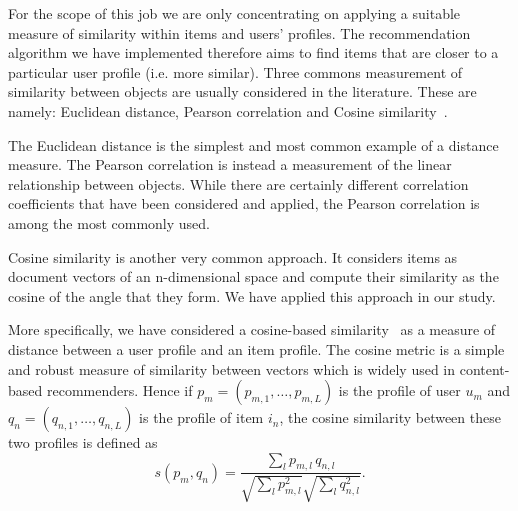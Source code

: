 For the scope of this job we are only concentrating on applying a suitable measure of similarity within items and users' profiles. The recommendation algorithm we have implemented therefore aims to find items that are closer to a particular user profile (i.e. more similar). Three commons measurement of similarity between objects are usually considered in the literature. These are namely: Euclidean distance, Pearson correlation and Cosine similarity~\cite{Lops11B}. 

The Euclidean distance is the simplest and most common example of a distance measure. The Pearson correlation is instead a measurement of the linear relationship between objects. While there are certainly different correlation coefficients that have been considered and applied, the Pearson correlation is among the most commonly used. 

Cosine similarity is another very common approach. It considers items as document vectors of an n-dimensional space and compute their similarity as the cosine of the angle that they form. We have applied this approach in our study.

More specifically, we have considered a cosine-based similarity~\cite{Markines09WWW} as a measure of distance between a user profile and an item profile.
The cosine metric is a simple and robust measure of similarity between vectors which is widely used in content-based recommenders.
Hence if $p_m = (p_{m,1},\ldots,p_{m,L})$ is the profile of user $u_m$ and $ q_n=(q_{n,1},\ldots,q_{n,L}) $  is the profile of item $i_n$, the cosine similarity between these two profiles is defined as
$$ s(p_m,q_n)= \frac { \sum_{l} {p_{m,l}}\, q_{n,l} } { \sqrt{\sum_l {p_{m,l}^2} } \sqrt{ \sum_l {q_{n,l}^2 } } }.$$

